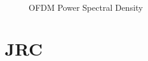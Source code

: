 \documentclass[onecolumn,conference]{IEEEtran}
\begin{document}
\begin{enumerate}
	\begin{figure}[H]
		\centering
    		\caption{OFDM Power Spectral Density}
    \end{figure}

    \section {JRC}

	\end{enumerate}
	
	\nocite{yang_subcarrier_multiplexing}
	{}
    
  
\end{document}
